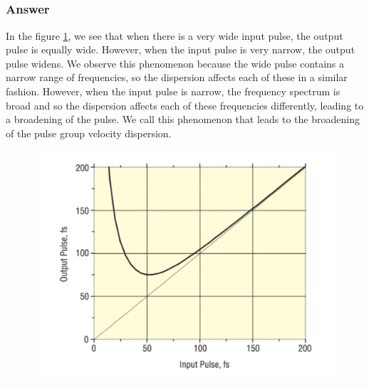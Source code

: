 \documentclass[12pt]{article}
\begin{document}
\subsection{}
\subsubsection{Answer}
In the figure \ref{fig:dispersion}, we see that when there is a very wide input pulse, the output pulse is equally wide. However, when the input pulse is very narrow, the output pulse widens. We observe this phenomenon because the wide pulse contains a narrow range of frequencies, so the dispersion affects each of these in a similar fashion. However, when the input pulse is narrow, the frequency spectrum is broad and so the dispersion affects each of these frequencies differently, leading to a broadening of the pulse. We call this phenomenon that leads to the broadening of the pulse group velocity dispersion.
\begin{figure}[h]
  \centering
  \includegraphics[width=\textwidth]{plot.png}
  \label{fig:dispersion}
\end{figure}
\end{document}
